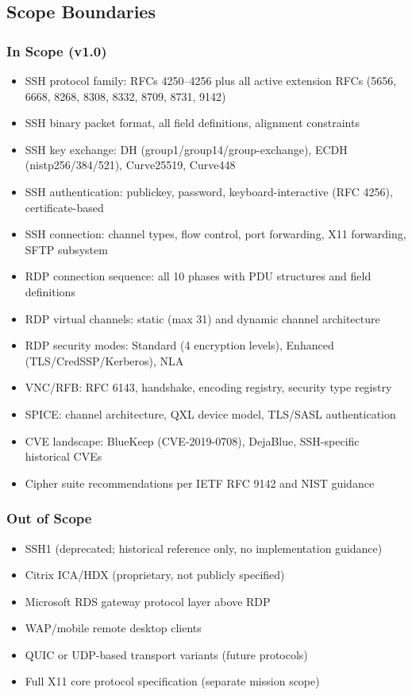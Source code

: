 \documentclass[11pt,letterpaper]{article}
\begin{document}
\subsection{Scope Boundaries}

\subsubsection{In Scope (v1.0)}
\begin{itemize}
\item SSH protocol family: RFCs 4250--4256 plus all active extension RFCs (5656, 6668, 8268, 8308, 8332, 8709, 8731, 9142)
\item SSH binary packet format, all field definitions, alignment constraints
\item SSH key exchange: DH (group1/group14/group-exchange), ECDH (nistp256/384/521), Curve25519, Curve448
\item SSH authentication: publickey, password, keyboard-interactive (RFC 4256), certificate-based
\item SSH connection: channel types, flow control, port forwarding, X11 forwarding, SFTP subsystem
\item RDP connection sequence: all 10 phases with PDU structures and field definitions
\item RDP virtual channels: static (max 31) and dynamic channel architecture
\item RDP security modes: Standard (4 encryption levels), Enhanced (TLS/CredSSP/Kerberos), NLA
\item VNC/RFB: RFC 6143, handshake, encoding registry, security type registry
\item SPICE: channel architecture, QXL device model, TLS/SASL authentication
\item CVE landscape: BlueKeep (CVE-2019-0708), DejaBlue, SSH-specific historical CVEs
\item Cipher suite recommendations per IETF RFC 9142 and NIST guidance
\end{itemize}

\subsubsection{Out of Scope}
\begin{itemize}
\item SSH1 (deprecated; historical reference only, no implementation guidance)
\item Citrix ICA/HDX (proprietary, not publicly specified)
\item Microsoft RDS gateway protocol layer above RDP
\item WAP/mobile remote desktop clients
\item QUIC or UDP-based transport variants (future protocols)
\item Full X11 core protocol specification (separate mission scope)
\end{itemize}
\end{document}
